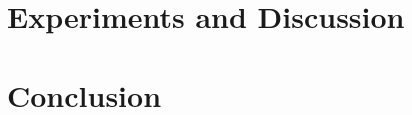 \documentclass[11pt, notitlepage]{report}
\begin{document}
\chapter{Experiments and Discussion} \label{chapter:experiments}


\chapter{Conclusion} \label{chapter:conclusion}


\begin{appendices}

\end{appendices}

\setlength{\bibsep}{1pt}
{


}
\end{document}
